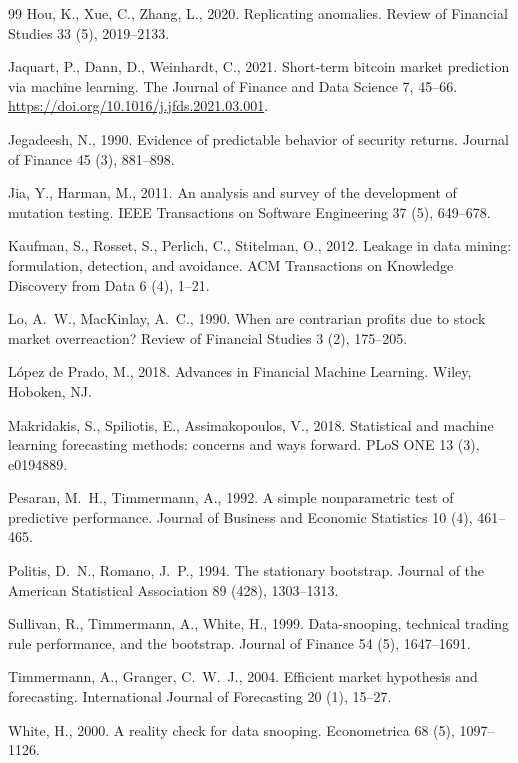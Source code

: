 \documentclass[preprint,12pt,authoryear]{elsarticle}
\begin{document}
\begin{thebibliography}{99}
Hou, K., Xue, C., Zhang, L., 2020.
Replicating anomalies.
Review of Financial Studies 33 (5), 2019--2133.

Jaquart, P., Dann, D., Weinhardt, C., 2021.
Short-term bitcoin market prediction via machine learning.
The Journal of Finance and Data Science 7, 45--66.
\url{https://doi.org/10.1016/j.jfds.2021.03.001}.

Jegadeesh, N., 1990.
Evidence of predictable behavior of security returns.
Journal of Finance 45 (3), 881--898.

Jia, Y., Harman, M., 2011.
An analysis and survey of the development of mutation testing.
IEEE Transactions on Software Engineering 37 (5), 649--678.

Kaufman, S., Rosset, S., Perlich, C., Stitelman, O., 2012.
Leakage in data mining: formulation, detection, and avoidance.
ACM Transactions on Knowledge Discovery from Data 6 (4), 1--21.

Lo, A.~W., MacKinlay, A.~C., 1990.
When are contrarian profits due to stock market overreaction?
Review of Financial Studies 3 (2), 175--205.

L\'opez de Prado, M., 2018.
Advances in Financial Machine Learning.
Wiley, Hoboken, NJ.

Makridakis, S., Spiliotis, E., Assimakopoulos, V., 2018.
Statistical and machine learning forecasting methods: concerns and ways forward.
PLoS ONE 13 (3), e0194889.

Pesaran, M.~H., Timmermann, A., 1992.
A simple nonparametric test of predictive performance.
Journal of Business and Economic Statistics 10 (4), 461--465.

Politis, D.~N., Romano, J.~P., 1994.
The stationary bootstrap.
Journal of the American Statistical Association 89 (428), 1303--1313.

Sullivan, R., Timmermann, A., White, H., 1999.
Data-snooping, technical trading rule performance, and the bootstrap.
Journal of Finance 54 (5), 1647--1691.

Timmermann, A., Granger, C.~W.~J., 2004.
Efficient market hypothesis and forecasting.
International Journal of Forecasting 20 (1), 15--27.

White, H., 2000.
A reality check for data snooping.
Econometrica 68 (5), 1097--1126.

\end{thebibliography}
\end{document}
